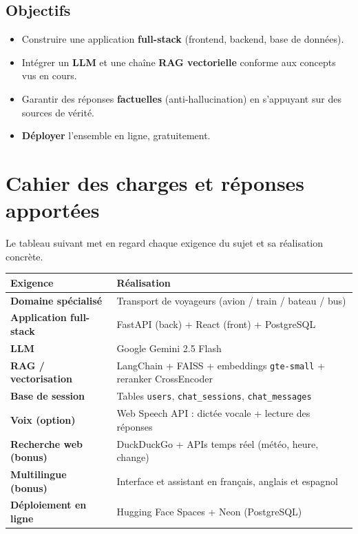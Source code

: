 \documentclass[11pt,a4paper]{article}
\newcommand{\code}[1]{\texttt{\small #1}}
\begin{document}
\subsection{Objectifs}
\begin{itemize}[nosep]
  \item Construire une application \textbf{full-stack} (frontend, backend, base de données).
  \item Intégrer un \textbf{LLM} et une chaîne \textbf{RAG vectorielle} conforme aux concepts vus en cours.
  \item Garantir des réponses \textbf{factuelles} (anti-hallucination) en s'appuyant sur des sources de vérité.
  \item \textbf{Déployer} l'ensemble en ligne, gratuitement.
\end{itemize}

\section{Cahier des charges et réponses apportées}

Le tableau suivant met en regard chaque exigence du sujet et sa réalisation concrète.

\begin{center}
\renewcommand{\arraystretch}{1.3}
\begin{tabular}{>{\bfseries}p{4.8cm} p{9.5cm}}
\toprule
Exigence & Réalisation \\
\midrule
Domaine spécialisé & Transport de voyageurs (avion / train / bateau / bus) \\
Application full-stack & FastAPI (back) + React (front) + PostgreSQL \\
LLM & Google Gemini 2.5 Flash \\
RAG / vectorisation & LangChain + FAISS + embeddings \code{gte-small} + reranker CrossEncoder \\
Base de session & Tables \code{users}, \code{chat\_sessions}, \code{chat\_messages} \\
Voix (option) & Web Speech API : dictée vocale + lecture des réponses \\
Recherche web (bonus) & DuckDuckGo + APIs temps réel (météo, heure, change) \\
Multilingue (bonus) & Interface et assistant en français, anglais et espagnol \\
Déploiement en ligne & Hugging Face Spaces + Neon (PostgreSQL) \\
\bottomrule
\end{tabular}
\end{center}
\end{document}

